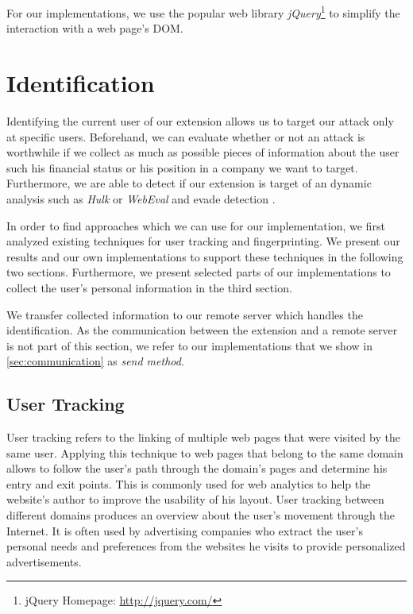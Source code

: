 	For our implementations, we use the popular web library \textit{jQuery}\footnote{jQuery Homepage: \url{http://jquery.com/}} to simplify the interaction with a web page's DOM. 

\newpage	
\section{Identification}
\label{sec:identification} 

	Identifying the current user of our extension allows us to target our attack only at specific users. Beforehand, we can evaluate whether or not an attack is worthwhile if we collect as much as possible pieces of information about the user such his financial status or his position in a company we want to target. Furthermore, we are able to detect if our extension is target of an dynamic analysis such as \textit{Hulk} or \textit{WebEval} and evade detection \cite{184485,190984}.
	
	In order to find approaches which we can use for our implementation, we first analyzed existing techniques for user tracking and fingerprinting. We present our results and our own implementations to support these techniques in the following two sections. Furthermore, we present selected parts of our implementations to collect the user's personal information in the third section.
	
	We transfer collected information to our remote server which handles the identification. As the communication between the extension and a remote server is not part of this section, we refer to our implementations that we show in \autoref{sec:communication} as \textit{send method}.
	
\subsection{User Tracking}
\label{sec:userTracking}

	User tracking refers to the linking of multiple web pages that were visited by the same user. Applying this technique to web pages that belong to the same domain allows to follow the user's path through the domain's pages and determine his entry and exit points. This is commonly used for web analytics to help the website's author to improve the usability of his layout. User tracking between different domains produces an overview about the user's movement through the Internet. It is often used by advertising companies who extract the user's personal needs and preferences from the websites he visits to provide personalized advertisements.
		
